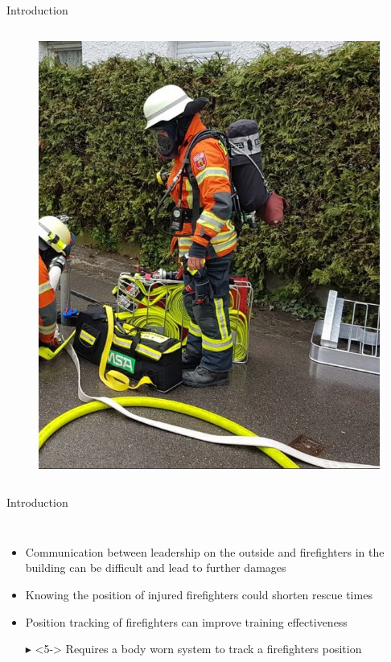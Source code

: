 \documentclass[aspectratio=169]{beamer}
\begin{document}
{\begin{frame}{Introduction}
\begin{columns}
			\begin{figure}
				\centering
				\includegraphics[height=0.7\textheight]{firefighter.png}
			\end{figure}
			
		\end{columns}
		
		
	\end{frame}
	
	\begin{frame}{Introduction}
			\begin{columns}
				\begin{itemize}
					\item<2-> Communication between leadership on the outside and firefighters in the building can be difficult and lead to further damages
					\item<3-> Knowing the position of injured firefighters could shorten rescue times
					\item<4-> Position tracking of firefighters can improve training effectiveness
					\item[$\blacktriangleright$]<5-> Requires a body worn system to track a firefighters position
				\end{itemize}
		

\end{columns}
\end{frame}}
\end{document}
